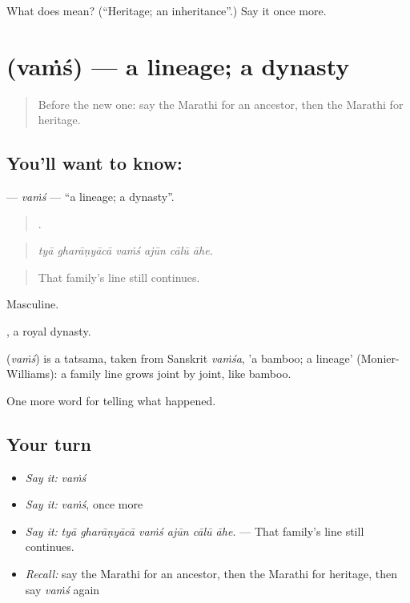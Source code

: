\begin{tcolorbox}[breakable,colback=teal!4,colframe=teal!35!black,title={Before you move on}]
What does  mean? (\textquotedblleft{}Heritage; an inheritance\textquotedblright{}.) Say it once more.
\end{tcolorbox}
\section[\texorpdfstring{\mr{वंश} (vaṁś)}{वंश (vaṁś)}]{ (vaṁś) — a lineage; a dynasty}

\label{lesson:MR-C308-vams}



\begin{quote}
Before the new one: say the Marathi for an ancestor, then the Marathi for heritage.
\end{quote}

\subsection*{You'll want to know: }
\textbf{} — \emph{vaṁś} — \textquotedblleft{}a lineage; a dynasty\textquotedblright{}.

\begin{quote}
     .
\end{quote}

\begin{quote}
\emph{tyā gharāṇyācā vaṁś ajūn cālū āhe.}
\end{quote}

\begin{quote}
That family's line still continues.
\end{quote}

Masculine.

, a royal dynasty.

\begin{cousinweb}
\textbf{} (\emph{vaṁś}) is a tatsama, taken from Sanskrit \emph{vaṁśa}, 'a bamboo; a lineage' (Monier-Williams): a family line grows joint by joint, like bamboo.
\end{cousinweb}

\begin{grammarlens}[title={What you've built}]
One more word for telling what happened.
\end{grammarlens}

\subsection*{Your turn}
\begin{itemize}
\raggedright
  \item \emph{Say it:} \emph{vaṁś}
  \item \emph{Say it:} \emph{vaṁś}, once more
  \item \emph{Say it:} \emph{tyā gharāṇyācā vaṁś ajūn cālū āhe.} — That family's line still continues.
  \item \emph{Recall:} say the Marathi for an ancestor, then the Marathi for heritage, then say \emph{vaṁś} again
\end{itemize}

